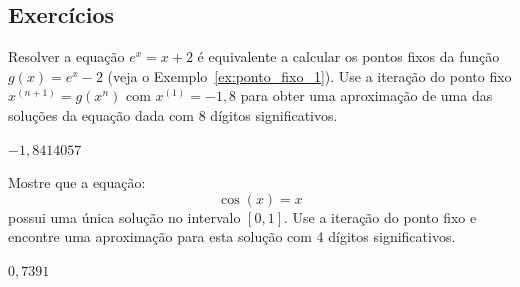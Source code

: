 \subsection*{Exercícios}

\begin{exer}
  Resolver a equação $e^x = x + 2$ é equivalente a calcular os pontos fixos da função $g(x) = e^x - 2$ (veja o Exemplo~\ref{ex:ponto_fixo_1}). Use a iteração do ponto fixo $x^{(n+1)} = g(x^{n})$ com $x^{(1)} = -1,8$ para obter uma aproximação de uma das soluções da equação dada com $8$ dígitos significativos.
\end{exer}
\begin{resp}
    $-1,8414057$
\end{resp}

\begin{exer}  Mostre que a equação:
  \begin{equation*}
    \cos(x)=x  
  \end{equation*}
possui uma única solução no intervalo $[0, 1]$. Use a iteração do ponto fixo e encontre uma aproximação para esta solução com  4 dígitos significativos.
\end{exer}
\begin{resp}
  
    $0,7391$
  
\end{resp}

